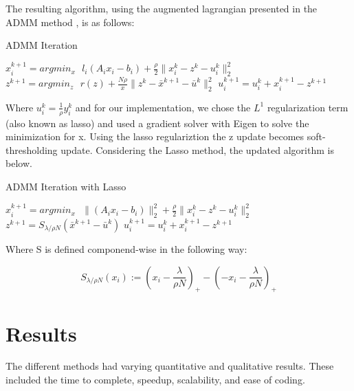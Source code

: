 \documentclass[letterpaper,12pt,onecolumn]{article}
\begin{document}
The resulting algorithm, using the augmented lagrangian presented in the ADMM method \cite{ADMM}, is as follows:

\begin{center}
\begin{algorithm}
\caption{ADMM Iteration}
\begin{algorithmic}[1]
	\STATE $x_{i}^{k+1} = argmin_{x} \: \: \: l_{i}(A_{i}x_{i} - b_{i}) + \frac{\rho}{2} \| x_{i}^{k} - z^{k} - u_{i}^{k} \|_{2}^{2}$ 
	\STATE $z^{k+1} = argmin_{z} \: \: \: r(z) + \frac{N \rho}{x} \| z^{k} - \bar{x}^{k+1} - \bar{u}^{k} \|_{2}^{2} $
	\STATE $u_{i}^{k+1} = u_{i}^{k} + x_{i}^{k+1} - z^{k+1} $ 
  \end{algorithmic}
\end{algorithm}
\end{center}

Where $u_{i}^{k} = \frac{1}{\rho} y_{i}^{k}$ and for our implementation, we chose the $L^{1}$ regularization term (also known as lasso) and used a gradient solver with Eigen to solve the minimization for x. Using the lasso regulariztion the z update becomes soft-thresholding update. Considering the Lasso method, the updated algorithm is below.

\begin{center}
\begin{algorithm}
\caption{ADMM Iteration with Lasso}
\begin{algorithmic}[1]
  \STATE $x_{i}^{k+1} = argmin_{x} \: \: \: \|(A_{i}x_{i} - b_{i})\|_{2}^{2} + \frac{\rho}{2} \| x_{i}^{k} - z^{k} - u_{i}^{k} \|_{2}^{2}$ 
  \STATE $z^{k+1} = S_{\lambda/\rho N} (\bar{x}^{k+1} - \bar{u}^{k})$
	\STATE $u_{i}^{k+1} = u_{i}^{k} + x_{i}^{k+1} - z^{k+1} $ 
  \end{algorithmic}
\end{algorithm}
\end{center}

Where S is defined componend-wise in the following way:
\begin{center}
	\begin{equation}
	  S_{\lambda/\rho N}(x_{i}) := (x_{i} - \frac{\lambda}{\rho N})_{+} - (-x_{i} - \frac{\lambda}{\rho N})_{+}
	\end{equation}
\end{center}



\section{Results}
The different methods had varying quantitative and qualitative results. These included the time to complete, speedup, scalability, and ease of coding. 
\end{document}
